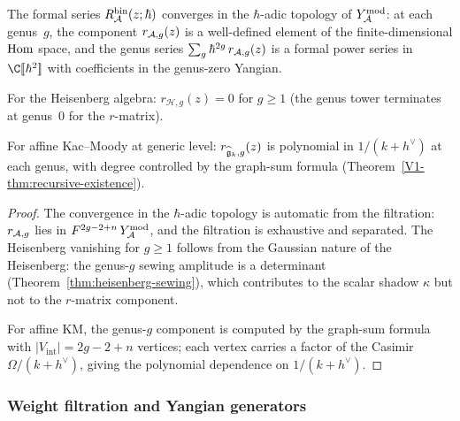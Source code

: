 \begin{proposition}
The formal series $R^{\mathrm{bin}}_{\mathcal{A}}(z;\hbar)$ converges in
the $\hbar$-adic topology of $Y^{\mathrm{mod}}_{\mathcal{A}}$: at each genus~$g$,
the component $r_{\mathcal{A},g}(z)$ is a well-defined element of the
finite-dimensional $\operatorname{Hom}$ space, and the genus series
$\sum_g \hbar^{2g}\,r_{\mathcal{A},g}(z)$ is a formal power series in
$\C[\![\hbar^2]\!]$ with coefficients in the genus-zero Yangian.

For the Heisenberg algebra: $r_{\mathcal{H},g}(z) = 0$ for
$g \geq 1$ \textup{(}the genus tower terminates at genus~$0$
for the $r$-matrix\textup{)}.

For affine Kac--Moody at generic level: $r_{\widehat{\mathfrak{g}}_k,g}(z)$
is polynomial in $1/(k+h^\vee)$ at each genus, with degree
controlled by the graph-sum formula
\textup{(}Theorem~\textup{\ref{V1-thm:recursive-existence})}.
\end{proposition}

\begin{proof}
The convergence in the $\hbar$-adic topology is automatic from the
filtration: $r_{\mathcal{A},g}$ lies in $F^{2g-2+n}\,Y^{\mathrm{mod}}_{\mathcal{A}}$, and the
filtration is exhaustive and separated. The Heisenberg vanishing
for $g \geq 1$ follows from the Gaussian nature of the Heisenberg:
the genus-$g$ sewing amplitude is a determinant
(Theorem~\ref{thm:heisenberg-sewing}), which contributes to the
scalar shadow $\kappa$ but not to the $r$-matrix component.

For affine KM, the genus-$g$ component is computed by the graph-sum
formula with $|V_{\mathrm{int}}| = 2g - 2 + n$ vertices; each
vertex carries a factor of the Casimir $\Omega/(k+h^\vee)$, giving
the polynomial dependence on $1/(k+h^\vee)$.
\end{proof}


\subsubsection{Weight filtration and Yangian generators}

